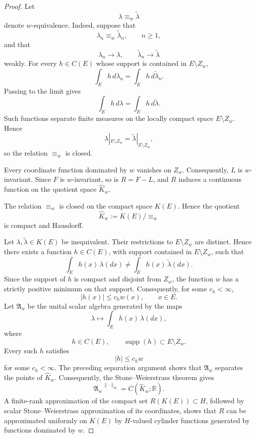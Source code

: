\documentclass[a4paper,10pt]{article}
\begin{document}
\begin{proof}
Let
\[
        \lambda\equiv_w\widetilde\lambda
\]
denote \(w\)-equivalence. Indeed, suppose that
\[
        \lambda_n\equiv_w\widetilde\lambda_n,
        \qquad n\ge1,
\]
and that
\[
        \lambda_n\longrightarrow\lambda,
        \qquad
        \widetilde\lambda_n\longrightarrow\widetilde\lambda
\]
weakly. For every \(h\in C(E)\) whose support is contained in
\(E\setminus Z_w\),
\[
        \int_Eh\,d\lambda_n
        =
        \int_Eh\,d\widetilde\lambda_n.
\]
Passing to the limit gives
\[
        \int_Eh\,d\lambda
        =
        \int_Eh\,d\widetilde\lambda.
\]
Such functions separate finite measures on the locally compact space
\(E\setminus Z_w\). Hence
\[
        \lambda|_{E\setminus Z_w}
        =
        \widetilde\lambda|_{E\setminus Z_w},
\]
so the relation \(\equiv_w\) is closed.

Every coordinate function dominated by \(w\) vanishes on \(Z_w\).
Consequently, \(L\) is \(w\)-invariant. Since \(F\) is
\(w\)-invariant, so is \(R=F-L\), and \(R\) induces a continuous
function on the quotient space \(\widehat K_w\).

The relation \(\equiv_w\) is closed on the
compact space \(K(E)\). Hence the quotient
\[
        \widehat K_w:=K(E)/{\equiv_w}
\]
is compact and Hausdorff.

Let \(\lambda,\widetilde\lambda\in K(E)\) be inequivalent. Their
restrictions to \(E\setminus Z_w\) are distinct. Hence there exists
a function \(h\in C(E)\), with support contained in
\(E\setminus Z_w\), such that
\[
        \int_Eh(x)\,\lambda(dx)
        \ne
        \int_Eh(x)\,\widetilde\lambda(dx).
\]
Since the support of \(h\) is compact and disjoint from \(Z_w\),
the function \(w\) has a strictly positive minimum on that support.
Consequently, for some \(c_h<\infty\),
\[
        |h(x)|\le c_hw(x),
        \qquad x\in E.
\]
Let \(\mathfrak A_w\) be the unital scalar algebra generated by the
maps
\[
        \lambda\longmapsto\int_Eh(x)\,\lambda(dx),
\]
where
\[
        h\in C(E),
        \qquad
        \operatorname{supp}(h)\subset E\setminus Z_w.
\]
Every such \(h\) satisfies
\[
        |h|\le c_hw
\]
for some \(c_h<\infty\). The preceding separation argument shows that
\(\mathfrak A_w\) separates the points of \(\widehat K_w\).
Consequently, the Stone--Weierstrass theorem gives
\[
        \overline{\mathfrak A_w}^{\,\lVert\cdot\rVert_\infty}
        =
        C(\widehat K_w;\mathbb R).
\] A finite-rank approximation of the
compact set \(R(K(E))\subset H\), followed by scalar
Stone--Weierstrass approximation of its coordinates, shows that
\(R\) can be approximated uniformly on \(K(E)\) by \(H\)-valued
cylinder functions generated by functions dominated by \(w\).


\end{proof}
\end{document}
